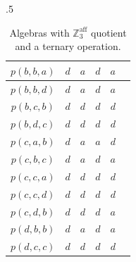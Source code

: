 \documentclass[11pt]{amsart}
\theoremstyle{definition}
\theoremstyle{remark}
\theoremstyle{plain}
\begin{document}
\begin{table}[H]
\begin{subtable}{.5\linewidth}
\begin{tabular}{|c||c|c|c|c|c|}
    $p(b,b,a)$  & $d$ & $a$ & $d$ & $a$ \\
\hline
	$p(b,b,d)$  & $d$ & $a$ & $d$ & $a$ \\
\hline

        $p(b,c,b)$  & $d$ & $d$ & $d$ & $d$ \\
\hline
	$p(b,d,c)$  & $d$ & $d$ & $d$ & $d$ \\
\hline
 
	$p(c,a,b)$ & $d$ & $a$ & $a$ & $d$ \\
\hline
	$p(c,b,c)$ & $d$ & $a$ & $d$ & $a$ \\

\hline
	$p(c,c,a)$ & $d$ & $d$ & $d$ & $d$ \\
\hline
	$p(c,c,d)$ & $d$ & $d$ & $d$ & $d$ \\
\hline
	$p(c,d,b)$ & $d$ & $d$ & $d$ & $a$ \\
\hline
	$p(d,b,b)$ & $d$ & $a$ & $d$ & $a$ \\
\hline
	$p(d,c,c)$ & $d$ & $d$ & $d$ & $d$ \\
\hline

\end{tabular} 
\caption{Remaining values.}
\label{3affremain}
\end{subtable}
\caption{Algebras with $\mathbb{Z}^{\text{aff}}_3$ quotient and a ternary operation.}
\end{table}
\end{document}
